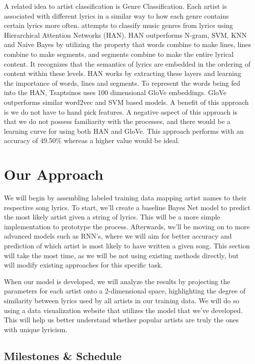 \documentclass[11pt,a4paper]{article}
\begin{document}
A related idea to artist classification is Genre Classification.  Each artist is associated with different lyrics in a similar way to how each genre contains certain lyrics more often.
  attempts to classify music genres from lyrics using Hierarchical Attention Networks (HAN). 
HAN outperforms N-gram, SVM, KNN and Naive Bayes by utilizing the property that words combine to make lines, lines combine to make segments, and segments combine to make the entire lyrical content.
It recognizes that the semantics of lyrics are embedded in the ordering of content within these levels. 
HAN works by extracting these layers and learning the importance of words, lines and segments. 
To represent the words being fed into the HAN, Tsaptsinos uses 100 dimensional GloVe embeddings. 
GloVe outperforms similar word2vec and SVM based models. 
A benefit of this approach is we do not have to hand pick features.
A negative aspect of this approach is that we do not possess familiarity with the processes, and there would be a learning curve for using both HAN and GloVe. 
This approach performs with an accuracy of 49.50\% whereas a higher value would be ideal. 

\section{Our Approach}
We will begin by assembling labeled training data mapping artist names to their respective song lyrics. 
To start, we'll create a baseline Bayes Net model to predict the most likely artist given a string of lyrics. 
This will be a more simple implementation to prototype the process. 
Afterwards, we'll be moving on to more advanced models such as RNN's, where we will aim for better accuracy and prediction of which artist is most likely to have written a given song.
This section will take the most time, as we will be not using existing methods directly, but will modify existing approaches for this specific task. 


When our model is developed, we will analyze the results by projecting the parameters for each artist onto a 2-dimensional space, highlighting the degree of similarity between lyrics used by all artists in our training data. We will do so using a data visualization website that utilizes the model that we've developed. 
This will help us better understand whether popular artists are truly the ones with unique lyricism.

\subsection{Milestones \& Schedule}
\end{document}
